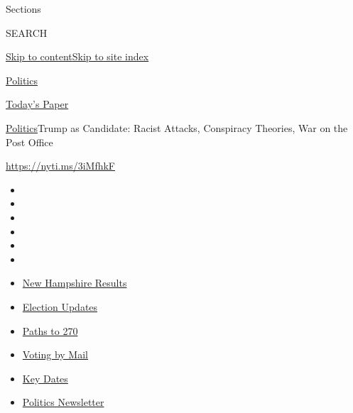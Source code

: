 Sections

SEARCH

\protect\hyperlink{site-content}{Skip to
content}\protect\hyperlink{site-index}{Skip to site index}

\href{https://www.nytimes3xbfgragh.onion/section/politics}{Politics}

\href{https://myaccount.nytimes3xbfgragh.onion/auth/login?response_type=cookie\&client_id=vi}{}

\href{https://www.nytimes3xbfgragh.onion/section/todayspaper}{Today's
Paper}

\href{/section/politics}{Politics}\textbar{}Trump as Candidate: Racist
Attacks, Conspiracy Theories, War on the Post Office

\url{https://nyti.ms/3iMfhkF}

\begin{itemize}
\item
\item
\item
\item
\item
\item
\end{itemize}

\begin{itemize}
\item
  \href{https://www.nytimes3xbfgragh.onion/interactive/2020/09/08/us/elections/results-new-hampshire-primary-elections.html?action=click\&pgtype=Article\&state=default\&region=TOP_BANNER\&context=storylines_menu}{New
  Hampshire Results}
\item
  \href{https://www.nytimes3xbfgragh.onion/live/2020/09/09/us/trump-vs-biden?action=click\&pgtype=Article\&state=default\&region=TOP_BANNER\&context=storylines_menu}{Election
  Updates}
\item
  \href{https://www.nytimes3xbfgragh.onion/interactive/2020/us/elections/election-states-biden-trump.html?action=click\&pgtype=Article\&state=default\&region=TOP_BANNER\&context=storylines_menu}{Paths
  to 270}
\item
  \href{https://www.nytimes3xbfgragh.onion/interactive/2020/08/31/us/politics/vote-by-mail-deadlines.html?action=click\&pgtype=Article\&state=default\&region=TOP_BANNER\&context=storylines_menu}{Voting
  by Mail}
\item
  \href{https://www.nytimes3xbfgragh.onion/interactive/2019/us/elections/2020-presidential-election-calendar.html?action=click\&pgtype=Article\&state=default\&region=TOP_BANNER\&context=storylines_menu}{Key
  Dates}
\item
  \href{https://www.nytimes3xbfgragh.onion/newsletters/politics?action=click\&pgtype=Article\&state=default\&region=TOP_BANNER\&context=storylines_menu}{Politics
  Newsletter}
\end{itemize}

